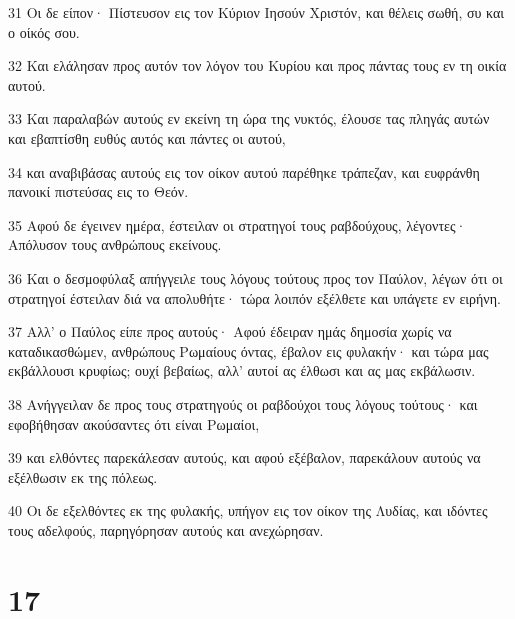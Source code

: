 \par 31 Οι δε είπον· Πίστευσον εις τον Κύριον Ιησούν Χριστόν, και θέλεις σωθή, συ και ο οίκός σου.
\par 32 Και ελάλησαν προς αυτόν τον λόγον του Κυρίου και προς πάντας τους εν τη οικία αυτού.
\par 33 Και παραλαβών αυτούς εν εκείνη τη ώρα της νυκτός, έλουσε τας πληγάς αυτών και εβαπτίσθη ευθύς αυτός και πάντες οι αυτού,
\par 34 και αναβιβάσας αυτούς εις τον οίκον αυτού παρέθηκε τράπεζαν, και ευφράνθη πανοικί πιστεύσας εις το Θεόν.
\par 35 Αφού δε έγεινεν ημέρα, έστειλαν οι στρατηγοί τους ραβδούχους, λέγοντες· Απόλυσον τους ανθρώπους εκείνους.
\par 36 Και ο δεσμοφύλαξ απήγγειλε τους λόγους τούτους προς τον Παύλον, λέγων ότι οι στρατηγοί έστειλαν διά να απολυθήτε· τώρα λοιπόν εξέλθετε και υπάγετε εν ειρήνη.
\par 37 Αλλ' ο Παύλος είπε προς αυτούς· Αφού έδειραν ημάς δημοσία χωρίς να καταδικασθώμεν, ανθρώπους Ρωμαίους όντας, έβαλον εις φυλακήν· και τώρα μας εκβάλλουσι κρυφίως; ουχί βεβαίως, αλλ' αυτοί ας έλθωσι και ας μας εκβάλωσιν.
\par 38 Ανήγγειλαν δε προς τους στρατηγούς οι ραβδούχοι τους λόγους τούτους· και εφοβήθησαν ακούσαντες ότι είναι Ρωμαίοι,
\par 39 και ελθόντες παρεκάλεσαν αυτούς, και αφού εξέβαλον, παρεκάλουν αυτούς να εξέλθωσιν εκ της πόλεως.
\par 40 Οι δε εξελθόντες εκ της φυλακής, υπήγον εις τον οίκον της Λυδίας, και ιδόντες τους αδελφούς, παρηγόρησαν αυτούς και ανεχώρησαν.

\chapter{17}

